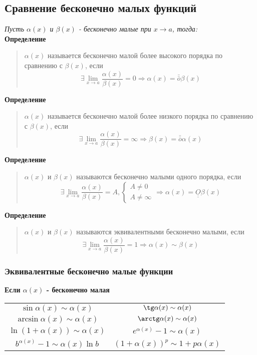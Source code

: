 \documentclass[11pt]{article}
\begin{document}
\subsection{Сравнение бесконечно малых функций}
\textit{Пусть $\alpha(x)$ и $\beta(x)$ - бесконечно малые при $x \rightarrow a$, тогда:}\\
\textbf{Определение}
\begin{quote}
  $\alpha(x)$ называется бесконечно малой более высокого порядка по сравнению с $\beta(x)$, если \[\exists\lim_{x \rightarrow a}\frac{\alpha(x)}{\beta(x)}=0 \Rightarrow \alpha(x)=\bar{\bar{o}}\beta(x)\]
\end{quote}
\textbf{Определение}
\begin{quote}
  $\alpha(x)$ называется бесконечно малой более низкого порядка по сравнению с $\beta(x)$, если \[\exists\lim_{x \rightarrow a}\frac{\alpha(x)}{\beta(x)}=\infty \Rightarrow \beta(x)=\bar{\bar{o}}\alpha(x)\]
\end{quote}
\textbf{Определение}
\begin{quote}
  $\alpha(x)$ и $\beta(x)$ называются бесконечно малыми одного порядка, если \[\exists\lim_{x \rightarrow a}\frac{\alpha(x)}{\beta(x)}=A,\begin{cases}A\neq0\\A\neq\infty\end{cases} \Rightarrow \alpha(x)=\underline{\underline{O}}\beta(x)\]
\end{quote}
\textbf{Определение}
\begin{quote}
  $\alpha(x)$ и $\beta(x)$ называются эквивалентными бесконечно малыми, если \[\exists\lim_{x \rightarrow a}\frac{\alpha(x)}{\beta(x)}=1 \Rightarrow \alpha(x)\sim\beta(x)\]
\end{quote}
\subsubsection{Эквивалентные бесконечно малые функции}
\textbf{Если $\alpha(x)$ - бесконечно малая}\\

\begin{center}
\begin{tabular}{cc}
  $\sin\alpha(x)\sim\alpha(x)$ & $\tg\alpha(x)\sim\alpha(x)$ \\
  $\arcsin\alpha(x)\sim\alpha(x)$ & $\arctg\alpha(x)\sim\alpha(x)$ \\
  $\ln(1+\alpha(x))\sim\alpha(x)$ & $e^{\alpha(x)}-1\sim\alpha(x)$ \\
  $b^{\alpha(x)}-1\sim\alpha(x)\ln{b}$ & $(1+\alpha(x))^p\sim1+p\alpha(x)$ \\
\end{tabular}
\end{center}
\end{document}
